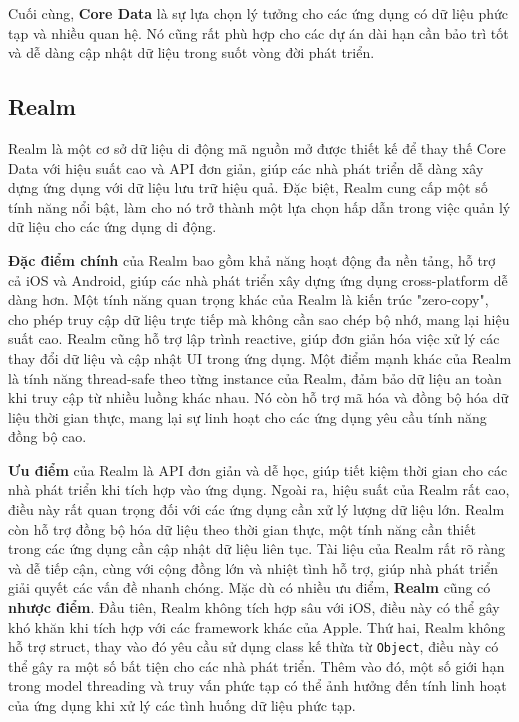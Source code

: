 Cuối cùng, \textbf{Core Data} là sự lựa chọn lý tưởng cho các ứng dụng có dữ liệu phức tạp và nhiều quan hệ. Nó cũng rất phù hợp cho các dự án dài hạn cần bảo trì tốt và dễ dàng cập nhật dữ liệu trong suốt vòng đời phát triển.

\subsection{Realm}
Realm là một cơ sở dữ liệu di động mã nguồn mở được thiết kế để thay thế Core Data với hiệu suất cao và API đơn giản, giúp các nhà phát triển dễ dàng xây dựng ứng dụng với dữ liệu lưu trữ hiệu quả. Đặc biệt, Realm cung cấp một số tính năng nổi bật, làm cho nó trở thành một lựa chọn hấp dẫn trong việc quản lý dữ liệu cho các ứng dụng di động.

\textbf{Đặc điểm chính} của Realm bao gồm khả năng hoạt động đa nền tảng, hỗ trợ cả iOS và Android, giúp các nhà phát triển xây dựng ứng dụng cross-platform dễ dàng hơn. Một tính năng quan trọng khác của Realm là kiến trúc "zero-copy", cho phép truy cập dữ liệu trực tiếp mà không cần sao chép bộ nhớ, mang lại hiệu suất cao. Realm cũng hỗ trợ lập trình reactive, giúp đơn giản hóa việc xử lý các thay đổi dữ liệu và cập nhật UI trong ứng dụng. Một điểm mạnh khác của Realm là tính năng thread-safe theo từng instance của Realm, đảm bảo dữ liệu an toàn khi truy cập từ nhiều luồng khác nhau. Nó còn hỗ trợ mã hóa và đồng bộ hóa dữ liệu thời gian thực, mang lại sự linh hoạt cho các ứng dụng yêu cầu tính năng đồng bộ cao.

\textbf{Ưu điểm} của Realm là API đơn giản và dễ học, giúp tiết kiệm thời gian cho các nhà phát triển khi tích hợp vào ứng dụng. Ngoài ra, hiệu suất của Realm rất cao, điều này rất quan trọng đối với các ứng dụng cần xử lý lượng dữ liệu lớn. Realm còn hỗ trợ đồng bộ hóa dữ liệu theo thời gian thực, một tính năng cần thiết trong các ứng dụng cần cập nhật dữ liệu liên tục. Tài liệu của Realm rất rõ ràng và dễ tiếp cận, cùng với cộng đồng lớn và nhiệt tình hỗ trợ, giúp nhà phát triển giải quyết các vấn đề nhanh chóng.
Mặc dù có nhiều ưu điểm, \textbf{Realm} cũng có \textbf{nhược điểm}. Đầu tiên, Realm không tích hợp sâu với iOS, điều này có thể gây khó khăn khi tích hợp với các framework khác của Apple. Thứ hai, Realm không hỗ trợ struct, thay vào đó yêu cầu sử dụng class kế thừa từ \texttt{Object}, điều này có thể gây ra một số bất tiện cho các nhà phát triển. Thêm vào đó, một số giới hạn trong model threading và truy vấn phức tạp có thể ảnh hưởng đến tính linh hoạt của ứng dụng khi xử lý các tình huống dữ liệu phức tạp.

